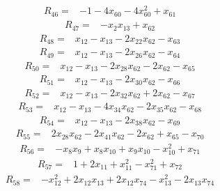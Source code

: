 {%
\begin{align*}
R_{46} ={}& -1 - 4x_{60} - 4x_{60}^{2} + x_{61}
\end{align*}
\begin{align*}
R_{47} ={}& -x_{2} x_{13} + x_{62}
\end{align*}
\begin{align*}
R_{48} ={}& x_{12} - x_{13} - 2x_{22} x_{62} - x_{63}
\end{align*}
\begin{align*}
R_{49} ={}& x_{12} - x_{13} - 2x_{26} x_{62} - x_{64}
\end{align*}
\begin{align*}
R_{50} ={}& x_{12} - x_{13} - 2x_{28} x_{62} - 2x_{62} - x_{65}
\end{align*}
\begin{align*}
R_{51} ={}& x_{12} - x_{13} - 2x_{30} x_{62} - x_{66}
\end{align*}
\begin{align*}
R_{52} ={}& x_{12} - x_{13} - 2x_{32} x_{62} + 2x_{62} - x_{67}
\end{align*}
\begin{align*}
R_{53} ={}& x_{12} - x_{13} - 4x_{34} x_{62} - 2x_{35} x_{62} - x_{68}
\end{align*}
\begin{align*}
R_{54} ={}& x_{12} - x_{13} - 2x_{38} x_{62} - x_{69}
\end{align*}
\begin{align*}
R_{55} ={}& 2x_{28} x_{62} - 2x_{41} x_{62} - 2x_{62} + x_{65} - x_{70}
\end{align*}
\begin{align*}
R_{56} ={}& -x_{8} x_{9} + x_{8} x_{10} + x_{9} x_{10} - x_{10}^{2} + x_{71}
\end{align*}
\begin{align*}
R_{57} ={}& 1 + 2x_{11} + x_{11}^{2} - x_{71}^{2} + x_{72}
\end{align*}
\begin{align*}
R_{58} ={}& -x_{12}^{2} + 2x_{12} x_{13} + 2x_{12} x_{74} - x_{13}^{2} - 2x_{13} x_{74} \\

\end{align*}}
